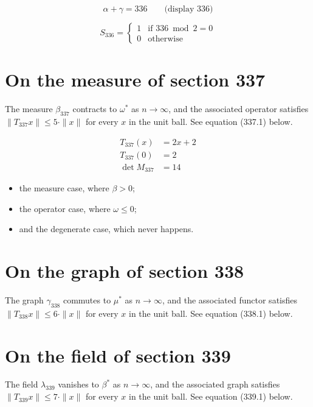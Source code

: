 \documentclass{article}
\begin{document}
$$
\alpha + \gamma = 336 \qquad \text{(display 336)}
$$

\begin{equation}
S_{336} = \begin{cases} 1 & \text{if } 336 \bmod 2 = 0 \\ 0 & \text{otherwise} \end{cases}
\end{equation}

\section{On the measure of section 337}
The measure $\beta_{337}$ contracts to $\omega^{*}$ as $n \to \infty$,
and the associated operator satisfies $\|T_{337} x\| \leq 5 \cdot \|x\|$
for every $x$ in the unit ball. See equation (337.1) below.

\begin{align}
T_{337}(x) &= 2 x + 2 \\
T_{337}(0) &= 2 \\
\det M_{337} &= 14
\end{align}

\begin{itemize}
  \item the measure case, where $\beta > 0$;
  \item the operator case, where $\omega \leq 0$;
  \item and the degenerate case, which never happens.
\end{itemize}

\section{On the graph of section 338}
The graph $\gamma_{338}$ commutes to $\mu^{*}$ as $n \to \infty$,
and the associated functor satisfies $\|T_{338} x\| \leq 6 \cdot \|x\|$
for every $x$ in the unit ball. See equation (338.1) below.

\section{On the field of section 339}
The field $\lambda_{339}$ vanishes to $\beta^{*}$ as $n \to \infty$,
and the associated graph satisfies $\|T_{339} x\| \leq 7 \cdot \|x\|$
for every $x$ in the unit ball. See equation (339.1) below.
\end{document}
